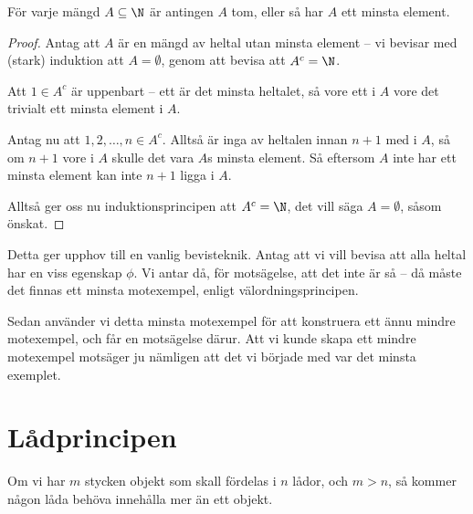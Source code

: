 \documentclass[nobib]{tufte-handout}
\begin{document}
\begin{theorem}[Välordningsprincipen]
  För varje mängd $A \subseteq \N$ är antingen $A$ tom, eller så har $A$ ett minsta element.

  \begin{proof}
    Antag att $A$ är en mängd av heltal utan minsta element -- vi bevisar med (stark) induktion att $A = \emptyset$, genom att bevisa att $A^c = \N$.

    Att $1 \in A^c$ är uppenbart -- ett är det minsta heltalet, så vore ett i $A$ vore det trivialt ett minsta element i $A$.

    Antag nu att $1, 2, \ldots, n \in A^c$. Alltså är inga av heltalen innan $n+1$ med i $A$, så om $n+1$ vore i $A$ skulle det vara $A$s minsta element. Så eftersom $A$ inte har ett minsta element kan inte $n+1$ ligga i $A$.

    Alltså ger oss nu induktionsprincipen att $A^c = \N$, det vill säga $A = \emptyset$, såsom önskat.
  \end{proof}
\end{theorem}

\begin{remark}
  Detta ger upphov till en vanlig bevisteknik. Antag att vi vill bevisa att alla heltal har en viss egenskap $\phi$. Vi antar då, för motsägelse, att det inte är så -- då måste det finnas ett minsta motexempel, enligt välordningsprincipen. 
  
  Sedan använder vi detta minsta motexempel för att konstruera ett ännu mindre motexempel, och får en motsägelse därur. Att vi kunde skapa ett mindre motexempel motsäger ju nämligen att det vi började med var det minsta exemplet.
\end{remark}

\section{Lådprincipen}

\begin{theorem}[Lådprincipen]
  Om vi har $m$ stycken objekt som skall fördelas i $n$ lådor, och $m > n$, så kommer någon låda behöva innehålla mer än ett objekt.
\end{theorem}
\end{document}
